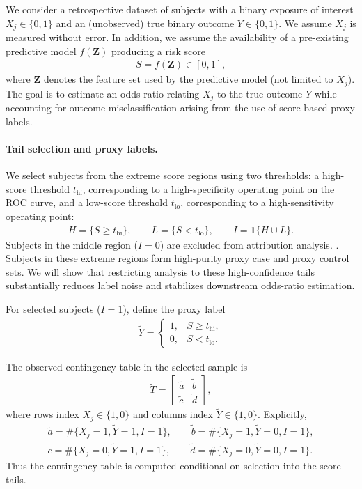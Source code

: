 \documentclass[pdflatex,sn-mathphys-num]{sn-jnl}%
\def\EQSP{3pt}
\newcommand{\cgather}[2][\EQSP]{\begingroup\setlength\abovedisplayskip{#1}\setlength\belowdisplayskip{#1}\begin{gather} #2 \end{gather}\endgroup\noindent}
\theoremstyle{thmstyleone}%
\theoremstyle{thmstyletwo}%
\theoremstyle{thmstylethree}%
\begin{document}
We consider a retrospective dataset of subjects with a binary exposure of interest $X_j\in\{0,1\}$ and an (unobserved) true binary outcome $Y\in\{0,1\}$. We assume $X_j$ is measured without error. In addition, we assume the availability of a pre-existing predictive model $f(\mathbf{Z})$ producing a risk score
\cgather{
S=f(\mathbf{Z})\in[0,1],
}
where $\mathbf{Z}$ denotes the feature set used by the predictive model (not limited to $X_j$). The goal is to estimate an odds ratio relating $X_j$ to the true outcome $Y$ while accounting for outcome misclassification arising from the use of score-based proxy labels.

\paragraph{Tail selection and proxy labels.}


We select subjects from the extreme score regions using two thresholds: a high-score threshold $t_{\mathrm{hi}}$, corresponding to a high-specificity operating point on the ROC curve, and a low-score threshold $t_{\mathrm{lo}}$, corresponding to a high-sensitivity operating point:
\cgather{
H=\{S\ge t_{\mathrm{hi}}\},\qquad
L=\{S<t_{\mathrm{lo}}\},\qquad
I=\mathbf{1}\{H\cup L\}.
}
Subjects in the middle region ($I=0$) are excluded from attribution analysis. . Subjects in these extreme regions form high-purity proxy case and proxy control sets. We will show that restricting analysis to these high-confidence tails substantially reduces label noise and stabilizes downstream odds-ratio estimation.

For selected subjects ($I=1$), define the proxy label
\cgather{
\tilde Y=
\begin{cases}
1,& S\ge t_{\mathrm{hi}},\\
0,& S<t_{\mathrm{lo}}.
\end{cases}
}

The observed contingency table in the selected sample is
\cgather{
\tilde{T}=
\begin{bmatrix}
\tilde{a} & \tilde{b}\\
\tilde{c} & \tilde{d}
\end{bmatrix},
}
where rows index $X_j\in\{1,0\}$ and columns index $\tilde Y\in\{1,0\}$. Explicitly,
\cgather{
\tilde a=\#\{X_j=1,\tilde Y=1,I=1\},\qquad
\tilde b=\#\{X_j=1,\tilde Y=0,I=1\},\\
\tilde c=\#\{X_j=0,\tilde Y=1,I=1\},\qquad
\tilde d=\#\{X_j=0,\tilde Y=0,I=1\}.
}
Thus the contingency table is computed conditional on selection into the score tails.
\end{document}

